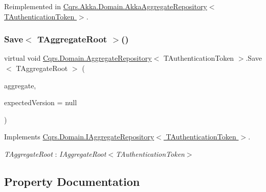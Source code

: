 Reimplemented in \hyperlink{classCqrs_1_1Akka_1_1Domain_1_1AkkaAggregateRepository_a144cbfdedb23039729ba5b3058f84e7a_a144cbfdedb23039729ba5b3058f84e7a}{Cqrs.\+Akka.\+Domain.\+Akka\+Aggregate\+Repository$<$ T\+Authentication\+Token $>$}.

\mbox{\label{classCqrs_1_1Domain_1_1AggregateRepository_aff9e828d19a091a4275f635bee4b3c9b_aff9e828d19a091a4275f635bee4b3c9b}} 
\subsubsection{\texorpdfstring{Save$<$ T\+Aggregate\+Root $>$()}{Save< TAggregateRoot >()}}
{\footnotesize\ttfamily virtual void \hyperlink{classCqrs_1_1Domain_1_1AggregateRepository}{Cqrs.\+Domain.\+Aggregate\+Repository}$<$ T\+Authentication\+Token $>$.Save$<$ T\+Aggregate\+Root $>$ (\begin{DoxyParamCaption}\item[{T\+Aggregate\+Root}]{aggregate,  }\item[{int?}]{expected\+Version = {\ttfamily null} }\end{DoxyParamCaption})\hspace{0.3cm}{\ttfamily [virtual]}}



Implements \hyperlink{interfaceCqrs_1_1Domain_1_1IAggregateRepository_a306baf8aa6faabe893f93e5db5d3517d_a306baf8aa6faabe893f93e5db5d3517d}{Cqrs.\+Domain.\+I\+Aggregate\+Repository$<$ T\+Authentication\+Token $>$}.

\begin{Desc}
\item[Type Constraints]\begin{description}
\item[{\em T\+Aggregate\+Root} : {\em I\+Aggregate\+Root$<$T\+Authentication\+Token$>$}]\end{description}
\end{Desc}


\subsection{Property Documentation}
\mbox{\label{classCqrs_1_1Domain_1_1AggregateRepository_a9c2ffdf87ba242cf0c540f4b0d020777_a9c2ffdf87ba242cf0c540f4b0d020777}} 
